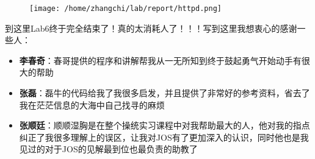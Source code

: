 \documentclass{article}
\newcommand{\highlight}[1]{{\bfseries \color{red}  #1}}
\begin{document}
\begin{CJK*}{UTF8}{gkai}
\begin{figure}[htp]
\centering
\texttt{[image: /home/zhangchi/lab/report/httpd.png]}
\end{figure}




\vspace{3em}

到这里Lab6终于完全结束了！真的太消耗人了！！！写到这里我想衷心的感谢一些人：

\begin{itemize}
\item{\highlight{李春奇}：春哥提供的程序和讲解帮我从一无所知到终于鼓起勇气开始动手有很大的帮助}
\item{\highlight{张磊}：磊牛的代码给我了我很多启发，并且提供了非常好的参考资料，省去了我在茫茫信息的大海中自己找寻的麻烦}
\item{\highlight{张顺廷}：顺顺湿胸是在整个操统实习课程中对我帮助最大的人，他对我的指点纠正了我很多理解上的误区，让我对JOS有了更加深入的认识，同时他也是我见过的对于JOS的见解最到位也最负责的助教了}
\end{itemize}

\clearpage

\end{CJK*}
\end{document}
